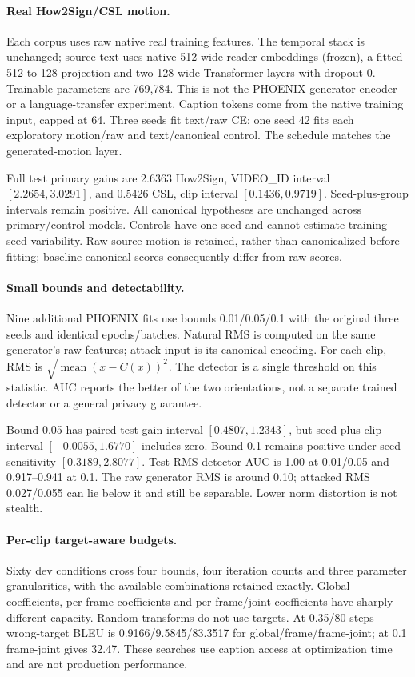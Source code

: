 \documentclass[10pt,twocolumn,letterpaper]{article}
\begin{document}
\paragraph{Real How2Sign/CSL motion.}
Each corpus uses raw native real training features. The temporal stack is unchanged; source text uses native 512-wide reader embeddings (frozen), a fitted 512 to 128 projection and two 128-wide Transformer layers with dropout 0. Trainable parameters are 769,784. This is not the PHOENIX generator encoder or a language-transfer experiment. Caption tokens come from the native training input, capped at 64. Three seeds fit text/raw CE; one seed 42 fits each exploratory motion/raw and text/canonical control. The schedule matches the generated-motion layer.


Full test primary gains are 2.6363 How2Sign, VIDEO\_ID interval $[2.2654,3.0291]$, and 0.5426 CSL, clip interval $[0.1436,0.9719]$. Seed-plus-group intervals remain positive. All canonical hypotheses are unchanged across primary/control models. Controls have one seed and cannot estimate training-seed variability. Raw-source motion is retained, rather than canonicalized before fitting; baseline canonical scores consequently differ from raw scores.

\paragraph{Small bounds and detectability.}
Nine additional PHOENIX fits use bounds 0.01/0.05/0.1 with the original three seeds and identical epochs/batches. Natural RMS is computed on the same generator's raw features; attack input is its canonical encoding. For each clip, RMS is $\sqrt{\operatorname{mean}(x-C (x))^2}$. The detector is a single threshold on this statistic. AUC reports the better of the two orientations, not a separate trained detector or a general privacy guarantee.


Bound 0.05 has paired test gain interval $[0.4807,1.2343]$, but seed-plus-clip interval $[-0.0055,1.6770]$ includes zero. Bound 0.1 remains positive under seed sensitivity $[0.3189,2.8077]$. Test RMS-detector AUC is 1.00 at 0.01/0.05 and 0.917--0.941 at 0.1. The raw generator RMS is around 0.10; attacked RMS 0.027/0.055 can lie below it and still be separable. Lower norm distortion is not stealth.

\paragraph{Per-clip target-aware budgets.}
Sixty dev conditions cross four bounds, four iteration counts and three parameter granularities, with the available combinations retained exactly. Global coefficients, per-frame coefficients and per-frame/joint coefficients have sharply different capacity. Random transforms do not use targets. At 0.35/80 steps wrong-target BLEU is 0.9166/9.5845/83.3517 for global/frame/frame-joint; at 0.1 frame-joint gives 32.47. These searches use caption access at optimization time and are not production performance.
\end{document}
